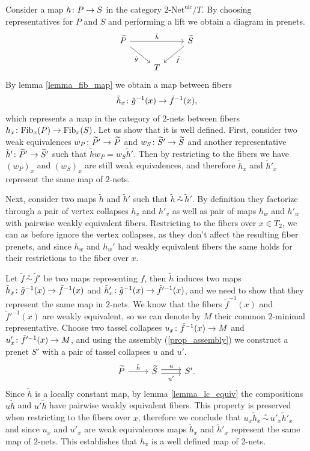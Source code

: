\documentclass[letterpaper,12pt,leqno]{article}
\numberwithin{equation}{theorem}
\def\Fib{\mathrm{Fib}}
\def\Net{\textrm{-}\mathrm{Net}}
\def\simo{\,\mathop{\sim}\limits^\circ\,}
\def\ulc{\mathrm{ulc}}
\begin{document}
\begin{nparagraph}
Consider a map $h\colon P \to S$ in the category $2\Net^\ulc / T$. By choosing representatives for $P$ and $S$ and performing a lift we obtain a diagram in prenets.
$$
\begin{tikzcd}
\wtilde P \ar[dr, "\tilde g"'] \ar[rr, "\tilde h"] && \wtilde S \ar[dl, "\tilde f"] \\
& T &
\end{tikzcd}
$$
By lemma \ref{lemma_fib_map} we obtain a map between fibers
$$
\tilde h_x \colon \tilde g^{-1}(x) \to \tilde f^{-1}(x),
$$
which represents a map in the category of $2$-nets between fibers $h_x\from \Fib_x(P) \to \Fib_x(S)$. Let us show that it is well defined. First, consider two weak equivalences
$w_P\colon \widetilde P' \to \widetilde P$ and $w_S\colon \widetilde S' \to \widetilde S$ and another representative $\tilde h'\colon \widetilde P' \to \widetilde S'$ such that $\tilde h w_P = w_S \tilde h'$.
Then by restricting to the fibers we have $(w_P)_x$ and $(w_S)_x$ are still weak equivalences, and therefore $\tilde h_x$ and $\tilde h'_x$ represent the same map of $2$-nets.

Next, consider two maps $\tilde h$ and $\tilde h'$ such that $\tilde h \simo \tilde h'$. By definition they factorize through a pair of vertex collapses $h_v$ and $h'_v$ as well
as pair of maps $h_w$ and $h'_w$ with pairwise weakly equivalent fibers. Restricting to the fibers over $x \in T_2$, we can as before ignore the vertex collapses, as they don't affect
the resulting fiber prenets, and since $h_w$ and $h_w'$ had weakly equivalent fibers the same holds for their restrictions to the fiber over $x$.

Let $\tilde f \simo \tilde f'$ be two maps representing $f$, then $\tilde h$ induces two maps $\tilde h_x\colon \tilde g^{-1}(x) \to \tilde f^{-1}(x)$ and
$\tilde h'_x\colon \tilde g^{-1}(x) \to \tilde f'^{-1}(x)$, and we need to show that they represent the same map in $2$-nets. We know that the fibers $\tilde f^{-1}(x)$
and $\tilde f'^{-1}(x)$ are weakly equivalent, so we can denote by $M$ their common $2$-minimal representative. Choose two tassel collapses $u_x\colon \tilde f^{-1}(x) \to M$
and $u'_x\colon \tilde f'^{-1}(x) \to M$, and using the assembly (\ref{prop_assembly}) we construct a prenet $S'$ with a pair of tassel collapses $u$ and $u'$.
$$
\begin{tikzcd}
\wtilde P \ar[r, "\tilde h"] & \wtilde S \ar[shift left, r, "u"] \ar[shift right, r, "u'"'] & S'.
\end{tikzcd}
$$
Since $\tilde h$ is a locally constant map, by lemma \ref{lemma_lc_equiv} the compositions $u \tilde h$ and $u' \tilde h$ have pairwise weakly equivalent fibers. This property
is preserved when restricting to the fibers over $x$, therefore we conclude that $u_x \tilde h_x \simo u'_x \tilde h'_x$ and since $u_x$ and $u'_x$ are weak equivalences
maps $\tilde h_x$ and $\tilde h'_x$ represent the same map of $2$-nets. This establishes that $h_x$ is a well defined map of $2$-nets.


\end{nparagraph}
\end{document}

